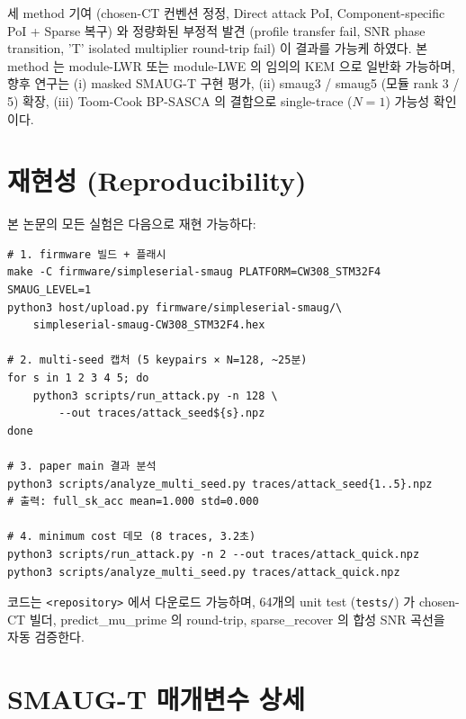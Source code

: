 \documentclass[11pt]{article}
\theoremstyle{plain}
\theoremstyle{definition}
\theoremstyle{remark}
\begin{document}
세 method 기여 (chosen-CT 컨벤션 정정, Direct attack PoI, Component-specific
PoI + Sparse 복구) 와 정량화된 부정적 발견 (profile transfer fail, SNR
phase transition, 'T' isolated multiplier round-trip fail) 이 결과를 가능케
하였다. 본 method 는 module-LWR 또는 module-LWE 의 임의의 KEM 으로
일반화 가능하며, 향후 연구는 (i) masked SMAUG-T 구현 평가, (ii) smaug3 /
smaug5 (모듈 rank 3 / 5) 확장, (iii) Toom-Cook BP-SASCA 의 결합으로
single-trace ($N=1$) 가능성 확인이다.

\section*{재현성 (Reproducibility)}
\label{sec:repro}

본 논문의 모든 실험은 다음으로 재현 가능하다:

\begin{verbatim}
# 1. firmware 빌드 + 플래시
make -C firmware/simpleserial-smaug PLATFORM=CW308_STM32F4 SMAUG_LEVEL=1
python3 host/upload.py firmware/simpleserial-smaug/\
    simpleserial-smaug-CW308_STM32F4.hex

# 2. multi-seed 캡처 (5 keypairs × N=128, ~25분)
for s in 1 2 3 4 5; do
    python3 scripts/run_attack.py -n 128 \
        --out traces/attack_seed${s}.npz
done

# 3. paper main 결과 분석
python3 scripts/analyze_multi_seed.py traces/attack_seed{1..5}.npz
# 출력: full_sk_acc mean=1.000 std=0.000

# 4. minimum cost 데모 (8 traces, 3.2초)
python3 scripts/run_attack.py -n 2 --out traces/attack_quick.npz
python3 scripts/analyze_multi_seed.py traces/attack_quick.npz
\end{verbatim}

코드는 \texttt{<repository>} 에서 다운로드 가능하며, 64개의 unit test
(\texttt{tests/}) 가 chosen-CT 빌더, predict\_mu\_prime 의 round-trip,
sparse\_recover 의 합성 SNR 곡선을 자동 검증한다.




\appendix

\section{SMAUG-T 매개변수 상세}
\label{app:params}
\end{document}
